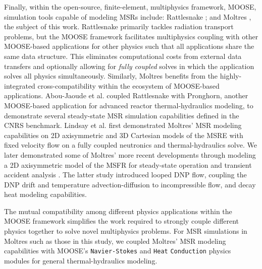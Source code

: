 Finally, within the open-source, finite-element, multiphysics framework, MOOSE,
simulation tools capable of modeling
\glspl{MSR} include: Rattlesnake \cite{wang_rattlesnake_2021}; and Moltres
\cite{lindsay_moltres_2017}, the subject of this work.
Rattlesnake primarily tackles radiation transport problems, but the MOOSE
framework facilitates multiphysics coupling
with other MOOSE-based applications for other physics
such that all applications share the same data structure. This eliminates
computational costs from external data transfers and optionally allowing for
\textit{fully coupled} solves in which the application solves all physics
simultaneously. Similarly, Moltres benefits from the highly-integrated
cross-compatibility
within the ecosystem of MOOSE-based applications. Abou-Jaoude et al.
\cite{abou-jaoude_coupled_2020} coupled Rattlesnake with Pronghorn, another
MOOSE-based application for advanced reactor thermal-hydraulics modeling, to
demonstrate several steady-state \gls{MSR} simulation capabilities defined in
the CNRS benchmark. Lindsay et al.
\cite{lindsay_introduction_2018} first demonstrated Moltres' \gls{MSR} modeling
capabilities on 2D axisymmetric and 3D Cartesian models of the \gls{MSRE} with
fixed velocity flow on a fully coupled neutronics and thermal-hydraulics solve.
We later demonstrated some of Moltres' more recent developments through
modeling a 2D axisymmetric model of the \gls{MSFR} for steady-state operation
and transient accident analysis \cite{park_advancement_2020}. The latter study
introduced looped \gls{DNP} flow, coupling the \gls{DNP} drift and temperature 
advection-diffusion to incompressible flow, and decay heat modeling
capabilities.

The mutual compatibility among different physics applications within the
\gls{MOOSE} framework simplifies the work required to strongly couple
different physics together to solve novel multiphysics problems. For \gls{MSR}
simulations in Moltres such as those in this study, we coupled Moltres'
\gls{MSR} modeling capabilities with \gls{MOOSE}'s \texttt{Navier-Stokes} and
\texttt{Heat} \texttt{Conduction} physics modules \cite{peterson_overview_2018}
for general thermal-hydraulics modeling.

